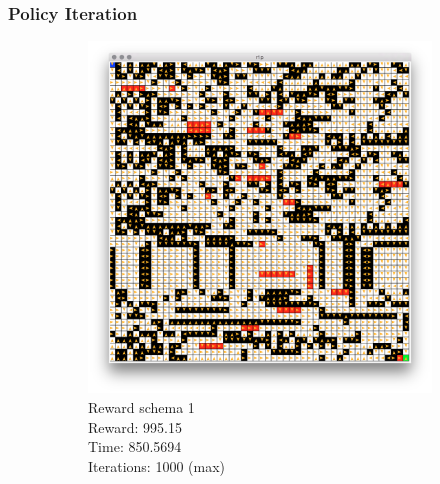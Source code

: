 \documentclass[a4paper,10pt]{article}
\begin{document}
\subsubsection{Policy Iteration}
\begin{figure}[H]
        \centering
        \begin{subfigure}[b]{0.3\textwidth}
                \includegraphics[width=\textwidth]{figures/50x50_p_r1.png}
                \caption{Reward schema 1\\
                Reward:  995.15 \\
                Time:  850.5694\\
                Iterations: 1000 (max)}
                \label{fig:gull}
        \end{subfigure}%
        ~ %
        \begin{subfigure}[b]{0.3\textwidth}

\end{subfigure}
\end{figure}
\end{document}
